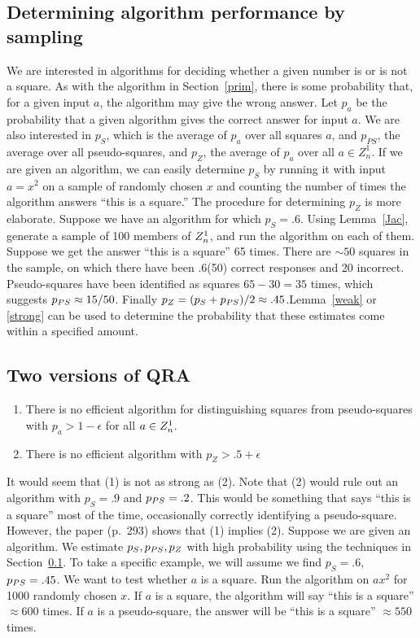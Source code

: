 \subsection{Determining algorithm performance by sampling}\label{samp}
We are interested in algorithms for deciding whether a given number
is or is not a square.  As with the algorithm in Section~\ref{prim},
there is some probability that, for a given input $a$, the algorithm
may give the wrong answer.
\pq Let $p_a$ be the probability that a given algorithm gives the correct
answer for input $a$.  We are also interested in $p_S$, which is the
average of $p_a$ over all squares $a$, and $p_{PS}$, the average over
all pseudo-squares, and $p_Z$, the average of $p_a$ over all $a\in Z^1_n$.
\pq If we are given an algorithm, we can easily determine $p_S$ by
running it with input $a=x^2$ on a sample of randomly chosen $x$ and
counting the number of times the algorithm answers ``this is a square.''
\pq The procedure for determining $p_Z$ is more elaborate.  Suppose we
have an algorithm for which $p_S=.6$.  Using Lemma~\ref{Jac}, generate
a sample of 100 members of $Z^1_n$, and run the algorithm on each of them.
Suppose we get the answer ``this is a square'' 65 times.  There are 
$\sim50$ squares in the sample, on which there have been .6(50) correct
responses and 20 incorrect.  Pseudo-squares have been identified as 
squares $65-30=35$ times, which suggests $p_{PS}\approx15/50$.  Finally
$p_Z=(p_S+p_{PS})/2\approx.45$.\pq Lemma~\ref{weak} or \ref{strong} can
be used to determine the probability that these estimates come within
a specified amount.
\subsection{Two versions of QRA}
\begin{enumerate}\item There is no efficient algorithm for distinguishing
squares from pseudo-squares with $p_a>1-\epsilon$ for all $a\in Z^1_n$.
\item There is no efficient algorithm with $p_Z>.5+\epsilon$
\end{enumerate}\par It would seem that (1) is not as strong as (2). Note
that (2) would rule out an algorithm with $p_S=.9$ and $p_{PS}=.2$.  This 
would be something that says ``this is a square'' most of the time, 
occasionally correctly identifying a pseudo-square.  However, the 
paper (p.~293) shows that (1) implies (2).
\pq Suppose we are given an algorithm.  We estimate $p_S,p_{PS},p_Z$ with
high probability using the techniques in Section~\ref{samp}.
To take a specific example, we will assume we find $p_S=.6$, $p_{PS}=.45$.
We want to test whether $a$ is a square.  Run the algorithm on $ax^2$
for 1000 randomly chosen $x$. If $a$ is a square, the algorithm will say
``this is a square'' $\approx600$ times.  If $a$ is a pseudo-square, the
answer will be ``this is a square'' $\approx550$ times.
